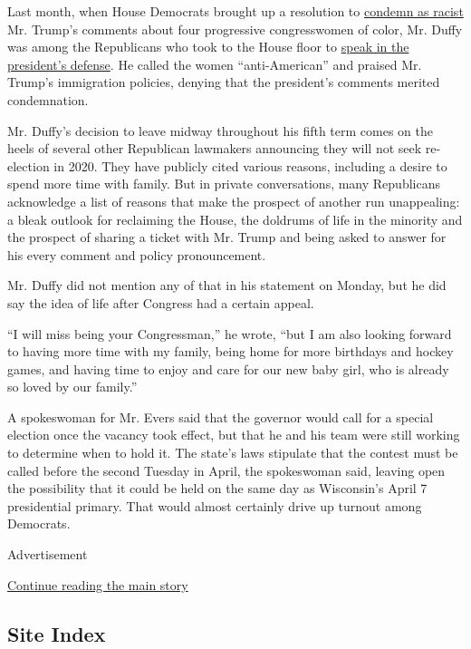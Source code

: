 Last month, when House Democrats brought up a resolution to
\href{https://www.nytimes3xbfgragh.onion/2019/07/16/us/politics/trump-tweet-house-vote.html}{condemn
as racist} Mr. Trump's comments about four progressive congresswomen of
color, Mr. Duffy was among the Republicans who took to the House floor
to
\href{https://www.nytimes3xbfgragh.onion/2019/07/16/us/politics/trump-tweet-house-vote.html}{speak
in the president's defense}. He called the women ``anti-American'' and
praised Mr. Trump's immigration policies, denying that the president's
comments merited condemnation.

Mr. Duffy's decision to leave midway throughout his fifth term comes on
the heels of several other Republican lawmakers announcing they will not
seek re-election in 2020. They have publicly cited various reasons,
including a desire to spend more time with family. But in private
conversations, many Republicans acknowledge a list of reasons that make
the prospect of another run unappealing: a bleak outlook for reclaiming
the House, the doldrums of life in the minority and the prospect of
sharing a ticket with Mr. Trump and being asked to answer for his every
comment and policy pronouncement.

Mr. Duffy did not mention any of that in his statement on Monday, but he
did say the idea of life after Congress had a certain appeal.

``I will miss being your Congressman,'' he wrote, ``but I am also
looking forward to having more time with my family, being home for more
birthdays and hockey games, and having time to enjoy and care for our
new baby girl, who is already so loved by our family.''

A spokeswoman for Mr. Evers said that the governor would call for a
special election once the vacancy took effect, but that he and his team
were still working to determine when to hold it. The state's laws
stipulate that the contest must be called before the second Tuesday in
April, the spokeswoman said, leaving open the possibility that it could
be held on the same day as Wisconsin's April 7 presidential primary.
That would almost certainly drive up turnout among Democrats.

Advertisement

\protect\hyperlink{after-bottom}{Continue reading the main story}

\hypertarget{site-index}{%
\subsection{Site Index}\label{site-index}}

